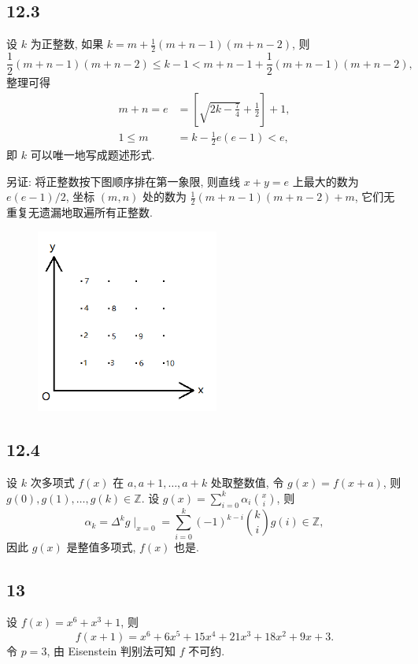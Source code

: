 \documentclass[12pt,a4paper,reqno]{amsart}
\theoremstyle{remark}
\newcommand{\Z}{\mathbb{Z}}
\renewcommand{\le}{\leqslant}
\begin{document}
\subsection*{12.3}
设 $k$ 为正整数, 如果 $k=m+\frac{1}{2}(m+n-1)(m+n-2)$, 则
  \[\frac{1}{2}(m+n-1)(m+n-2)\le k-1< m+n-1+\frac{1}{2}(m+n-1)(m+n-2),\]
整理可得
  \[\begin{split}
     m+n=e&=\left[\sqrt{2k-\frac{7}{4}}+\frac{1}{2}\right]+1,\\
     1\le m&=k-\frac{1}{2}e(e-1)<e,\end{split}\]
即 $k$ 可以唯一地写成题述形式.

另证: 将正整数按下图顺序排在第一象限, 则直线 $x+y=e$ 上最大的数为 $e(e-1)/2$, 坐标 $(m,n)$ 处的数为 $\frac{1}{2}(m+n-1)(m+n-2)+m$, 它们无重复无遗漏地取遍所有正整数.

\begin{figure}
 \begin{minipage}[b]{0.5\linewidth} \centering
  \includegraphics[width=60mm]{fig1.12.3.png}
 \end{minipage}
\end{figure}

\subsection*{12.4}
设 $k$ 次多项式 $f(x)$ 在 $a,a+1,\ldots,a+k$ 处取整数值, 令 $g(x)=f(x+a)$, 则 $g(0),g(1),\ldots,g(k)\in\Z$. 设 $g(x)=\sum\limits_{i=0}^k \alpha_i{x\choose i}$, 则
  \[\alpha_k=\Delta^k g\mid_{x=0}=\sum_{i=0}^k (-1)^{k-i} {k\choose i}g(i)\in\Z,\]
因此 $g(x)$ 是整值多项式, $f(x)$ 也是.

\subsection*{13}
设 $f(x)=x^6+x^3+1$, 则
  \[f(x+1)=x^6+6x^5+15x^4+21x^3+18x^2+9x+3.\]
令 $p=3$, 由 Eisenstein 判别法可知 $f$ 不可约.
\end{document}
